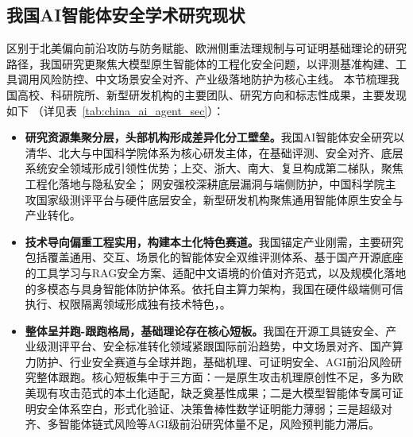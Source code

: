 \subsection{我国AI智能体安全学术研究现状}
区别于北美偏向前沿攻防与防务赋能、欧洲侧重法理规制与可证明基础理论的研究路径，我国研究更聚焦大模型原生智能体的工程化安全问题，以评测基准构建、工具调用风险防控、中文场景安全对齐、产业级落地防护为核心主线。
%
%
本节梳理我国高校、科研院所、新型研发机构的主要团队、研究方向和标志性成果，主要发现如下 （详见表~\ref{tab:china_ai_agent_sec}）：

\begin{itemize}[tabitem]
\item \textbf{研究资源集聚分层，头部机构形成差异化分工壁垒。}我国AI智能体安全研究以清华、北大与中国科学院体系为核心研发主体，在基础评测、安全对齐、底层系统安全领域形成引领性优势\cite{pandaguardCASIA2026}；上交、浙大、南大、复旦构成第二梯队，聚焦工程化落地与隐私安全\cite{aicertZJU2026,cosecNJU2026,jadeWhitzard2026}；
网安强校深耕底层漏洞与端侧防护，中国科学院主攻国家级测评平台与硬件底层安全\cite{chenweiICT2026,ictCASOfficial2026}，新型研发机构聚焦通用智能体原生安全与产业转化\cite{flagopenBAAI2026,intershannon2026}。

\item \textbf{技术导向偏重工程实用，构建本土化特色赛道。}我国锚定产业刚需，主要研究包括覆盖通用、交互、场景化的智能体安全双维评测体系\cite{csebenchmark2025}、基于国产开源底座的工具学习与RAG安全方案\cite{openmmlabSHLab2026}、适配中文语境的价值对齐范式，以及规模化落地的多模态与具身智能体防护体系\cite{reinEAD2025}。依托自主算力架构，我国在硬件级端侧可信执行、权限隔离领域形成独有技术特色，\cite{ictCASOfficial2026,flagopenBAAI2026}。

\item \textbf{整体呈并跑-跟跑格局，基础理论存在核心短板。}我国在开源工具链安全、产业级测评平台、安全标准转化领域紧跟国际前沿趋势\cite{jadeWhitzard2026}，中文场景对齐、国产算力防护、行业安全赛道与全球并跑，基础机理、可证明安全、AGI前沿风险研究整体跟跑。核心短板集中于三方面：一是原生攻击机理原创性不足，多为欧美现有攻击范式的本土化适配，缺乏奠基性成果；二是大模型智能体专属可证明安全体系空白，形式化验证、决策鲁棒性数学证明能力薄弱；三是超级对齐、多智能体链式风险等AGI级前沿研究体量不足，风险预判能力滞后\cite{zengyiCASIA2026,bigaiResearchDept2026}。
\end{itemize}



